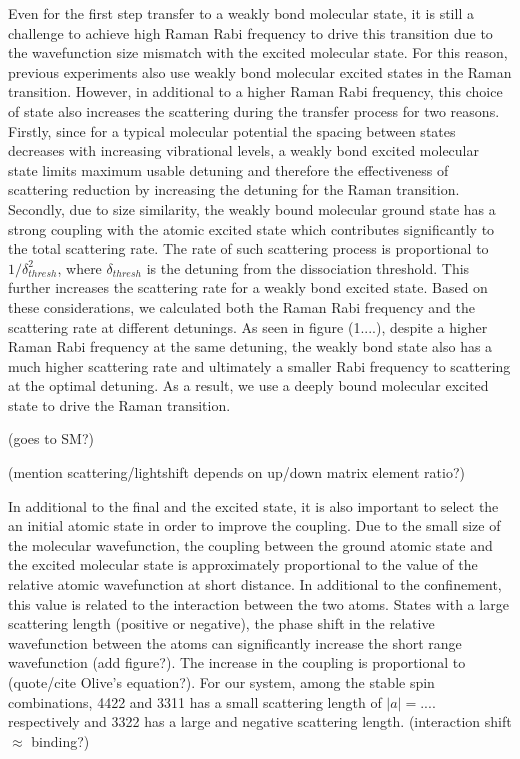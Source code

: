 \documentclass[aps,prl,twocolumn,groupedaddress]{revtex4-1}
\newcommand{\abs}[1]{{\left|{#1}\right|}}
\begin{document}
Even for the first step transfer to a weakly bond molecular state,
it is still a challenge to achieve high Raman Rabi frequency to drive this transition
due to the wavefunction size mismatch with the excited molecular state.
For this reason, previous experiments also use weakly bond molecular excited states
in the Raman transition.
However, in additional to a higher Raman Rabi frequency,
this choice of state also increases the scattering during the transfer process for two reasons.
Firstly, since for a typical molecular potential the spacing between states
decreases with increasing vibrational levels,
a weakly bond excited molecular state limits maximum usable detuning
and therefore the effectiveness of scattering reduction
by increasing the detuning for the Raman transition.
Secondly, due to size similarity, the weakly bound molecular ground state has a strong coupling
with the atomic excited state which contributes significantly to the total scattering rate.
The rate of such scattering process is proportional to $1/\delta_{thresh}^2$,
where $\delta_{thresh}$ is the detuning from the dissociation threshold.
This further increases the scattering rate for a weakly bond excited state.
Based on these considerations, we calculated both the Raman Rabi frequency
and the scattering rate at different detunings.
As seen in figure (1....), despite a higher Raman Rabi frequency at the same detuning,
the weakly bond state also has a much higher scattering rate
and ultimately a smaller Rabi frequency to scattering at the optimal detuning.
As a result, we use a deeply bound molecular excited state to drive the Raman transition.

(goes to SM?)

(mention scattering/lightshift depends on up/down matrix element ratio?)

In additional to the final and the excited state, it is also important to select the an initial atomic state in order to improve the coupling. Due to the small size of the molecular wavefunction, the coupling between the ground atomic state and the excited molecular state is approximately proportional to the value of the relative atomic wavefunction at short distance. In additional to the confinement, this value is related to the interaction between the two atoms. States with a large scattering length (positive or negative), the phase shift in the relative wavefunction between the atoms can significantly increase the short range wavefunction (add figure?). The increase in the coupling is proportional to (quote/cite Olive's equation?).
For our system, among the stable spin combinations, 4422 and 3311 has a small scattering length of $\abs{a}=....$ respectively and 3322 has a large and negative scattering length.
(interaction shift $\approx$ binding?)
\end{document}
